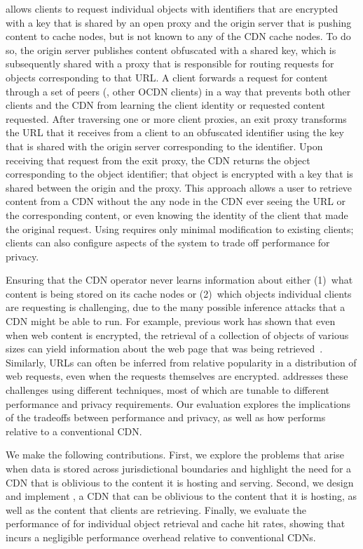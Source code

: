 \system{} allows clients to request individual objects with identifiers that
are encrypted with a key that is shared by an open proxy and the origin server
that is pushing content to cache nodes, but is not known to any of the CDN
cache nodes.  To do so, the origin server publishes content obfuscated with a
shared key, which is subsequently shared with a proxy that is responsible for
routing requests for objects corresponding to that URL.  A client forwards a
request for content through a set of peers (\ie, other OCDN clients) in a way
that prevents both other clients  and the CDN from learning the client
identity or requested content requested.  After traversing one or more client
proxies, an exit proxy transforms the URL that it receives from a client to an
obfuscated identifier using the key that is shared with the origin server
corresponding to the identifier.  Upon receiving that request from the exit
proxy, the CDN returns the object corresponding to the object identifier; that
object is encrypted with a key that is shared between the origin and the
proxy. This approach allows a user to retrieve content from a CDN without the
any node in the CDN ever seeing the URL or the corresponding content, or even knowing
the identity of the client that made the original request. Using \system{} requires
only minimal modification to existing clients; clients can also configure aspects
of the system to trade off performance for privacy.

Ensuring that the CDN operator never
learns information about either (1)~what content is being stored on its cache
nodes or (2)~which objects individual clients are requesting is
challenging, due to the many possible inference attacks that a CDN might be
able to run. For example, previous work has shown that even when web content
is encrypted, the retrieval of a collection of objects of various sizes can
yield information about the web page that was being retrieved~\cite{panchenko2016website,
cai2012touching}. Similarly, URLs
can often be inferred from relative popularity in a distribution of web
requests, even when the requests themselves are encrypted. \system{} addresses
these challenges using different techniques, most of which are tunable to different 
performance and privacy requirements.  Our evaluation explores the implications of 
the tradeoffs between performance and privacy, as
well as how \system{} performs relative to a conventional CDN.

We make the following contributions. First, we explore the problems that
arise when data is stored across jurisdictional boundaries and highlight the
need for a CDN that is oblivious to the content it is hosting and serving.
Second, we design and implement \system{}, a CDN that can be oblivious to the
content that it is hosting, as well as the content that clients are
retrieving. Finally, we evaluate the performance of \system{} for individual
object retrieval and cache hit rates, showing that \system{} incurs a negligible performance
overhead relative to conventional CDNs.

